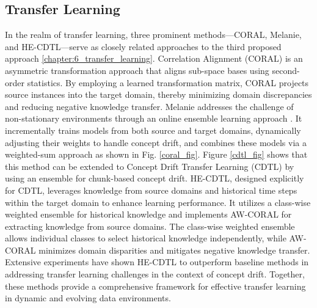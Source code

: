 \subsection{Transfer Learning}
\label{sec:3_6_2_related_work_transfer}

In the realm of transfer learning, three prominent methods—CORAL, Melanie, and HE-CDTL—serve as closely related approaches to the third proposed approach \ref{chapter:6_transfer_learning}. Correlation Alignment \cite{sun2016return} (CORAL) is an asymmetric transformation approach that aligns sub-space bases using second-order statistics. By employing a learned transformation matrix, CORAL projects source instances into the target domain, thereby minimizing domain discrepancies and reducing negative knowledge transfer. Melanie addresses the challenge of non-stationary environments through an online ensemble learning approach \cite{dong2019multistream}. It incrementally trains models from both source and target domains, dynamically adjusting their weights to handle concept drift, and combines these models via a weighted-sum approach as shown in Fig. \ref{coral_fig}. Figure \ref{cdtl_fig} shows that this method can be extended to Concept Drift Transfer Learning \cite{sun2016return} (CDTL) by using an ensemble for chunk-based concept drift. HE-CDTL, designed explicitly for CDTL, leverages knowledge from source domains and historical time steps within the target domain to enhance learning performance. It utilizes a class-wise weighted ensemble for historical knowledge and implements AW-CORAL for extracting knowledge from source domains. The class-wise weighted ensemble allows individual classes to select historical knowledge independently, while AW-CORAL minimizes domain disparities and mitigates negative knowledge transfer. Extensive experiments have shown HE-CDTL to outperform baseline methods in addressing transfer learning challenges in the context of concept drift. Together, these methods provide a comprehensive framework for effective transfer learning in dynamic and evolving data environments.

